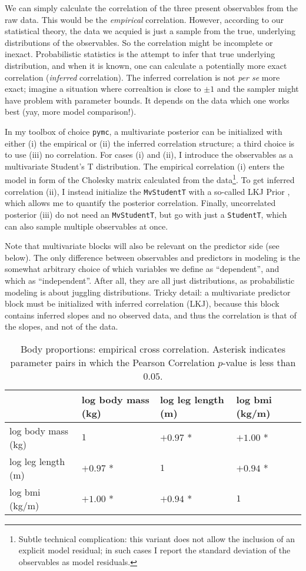 We can simply calculate the correlation of the three present observables from the raw data.
This would be the \emph{empirical} correlation.
However, according to our statistical theory, the data we acquied is just a sample from the true, underlying distributions of the observables.
So the correlation might be incomplete or inexact.
Probabilistic statistics is the attempt to infer that true underlying distribution, and when it is known, one can calculate a potentially more exact correlation (\emph{inferred} correlation).
The inferred correlation is not \emph{per se} more exact; imagine a situation where correaltion is close to \(\pm 1\) and the sampler might have problem with parameter bounds.
It depends on the data which one works best (yay, more model comparison!).


In my toolbox of choice \texttt{pymc}, a multivariate posterior can be initialized with either (i) the empirical or (ii) the inferred correlation structure; a third choice is to use (iii) no correlation.
For cases (i) and (ii), I introduce the observables as a multivariate Student's T distribution.
The empirical correlation (i) enters the model in form of the Cholesky matrix calculated from the data\footnote{Subtle technical complication: this variant does not allow the inclusion of an explicit model residual; in such cases I report the standard deviation of the observables as model residuals.}.
To get inferred correlation (ii), I instead initialize the \texttt{MvStudentT} with a so-called LKJ Prior \citep{LKJ2009}, which allows me to quantify the posterior correlation.
Finally, uncorrelated posterior (iii) do not need an \texttt{MvStudentT}, but go with just a \texttt{StudentT}, which can also sample multiple observables at once.

Note that multivariate blocks will also be relevant on the predictor side (see below).
The only difference between observables and predictors in modeling is the somewhat arbitrary choice of which variables we define as ``dependent'', and which as ``independent''.
After all, they are all just distributions, as probabilistic modeling is about juggling distributions.
Tricky detail: a multivariate predictor block must be initialized with inferred correlation (LKJ), because this block contains inferred slopes and no observed data, and thus the correlation is that of the slopes, and not of the data.


\begin{table}[p]
\caption{\label{tab:proportions_empiricalcorrelation}Body proportions: empirical cross correlation. Asterisk indicates parameter pairs in which the Pearson Correlation \(p\)-value is less than \(0.05\).}
\centering
\begin{tabular}{l|lll}
 & log body mass (kg) & log leg length (m) & log bmi (kg/m)\\[0pt]
\hline
log body mass (kg) & \(1\) & \(+0.97\) * & \(+1.00\) *\\[0pt]
log leg length (m) & \(+0.97\) * & \(1\) & \(+0.94\) *\\[0pt]
log bmi (kg/m) & \(+1.00\) * & \(+0.94\) * & \(1\)\\[0pt]
\end{tabular}
\end{table}

